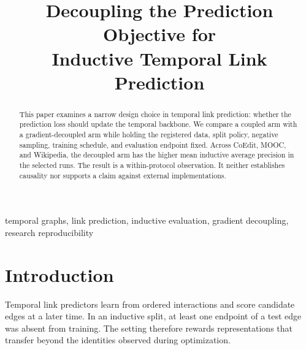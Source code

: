 \documentclass[conference]{IEEEtran}
\begin{document}
\title{Decoupling the Prediction Objective for\\
Inductive Temporal Link Prediction}

\author{%
\and
{}
\and
{}
}

\maketitle

\begin{abstract}
This paper examines a narrow design choice in temporal link prediction:
whether the prediction loss should update the temporal backbone. We compare a
coupled arm with a gradient-decoupled arm while holding the registered data,
split policy, negative sampling, training schedule, and evaluation endpoint
fixed. Across CoEdit, MOOC, and Wikipedia, the decoupled arm has the higher
mean inductive average precision in the selected runs. The result is a
within-protocol observation. It neither establishes causality nor supports a
claim against external implementations.
\end{abstract}

\begin{IEEEkeywords}
temporal graphs, link prediction, inductive evaluation, gradient decoupling,
research reproducibility
\end{IEEEkeywords}

\section{Introduction}

Temporal link predictors learn from ordered interactions and score candidate
edges at a later time. In an inductive split, at least one endpoint of a test
edge was absent from training. The setting therefore rewards representations
that transfer beyond the identities observed during optimization.
\end{document}
